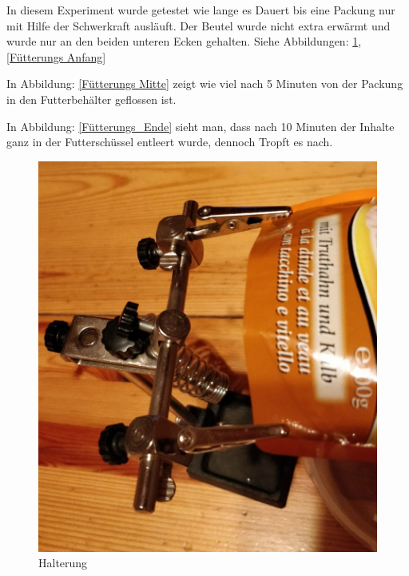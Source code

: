In diesem Experiment wurde getestet wie lange es Dauert bis eine Packung nur mit Hilfe der Schwerkraft ausläuft. Der Beutel wurde nicht extra erwärmt und wurde nur an den beiden unteren Ecken gehalten. Siehe Abbildungen: \ref{Halterung}, \ref{Fütterungs Anfang} 

In Abbildung: \ref{Fütterungs Mitte} zeigt wie viel nach 5 Minuten von der Packung in den Futterbehälter geflossen ist.

In Abbildung: \ref{Fütterungs_Ende} sieht man, dass nach 10 Minuten der Inhalte ganz in der Futterschüssel entleert wurde, dennoch Tropft es nach.


\begin{figure}[H]
   \begin{minipage}[hbt]{.4\linewidth} %
      \includegraphics[width=\linewidth]{Bilder/Fuetterungsexperiment/Aufhaengung}
      \caption{Halterung}
      \label{Halterung}
   \end{minipage}
   \hspace{.2\linewidth}%
   \begin{minipage}[hbt]{.4\linewidth} %

\end{minipage}
\end{figure}
